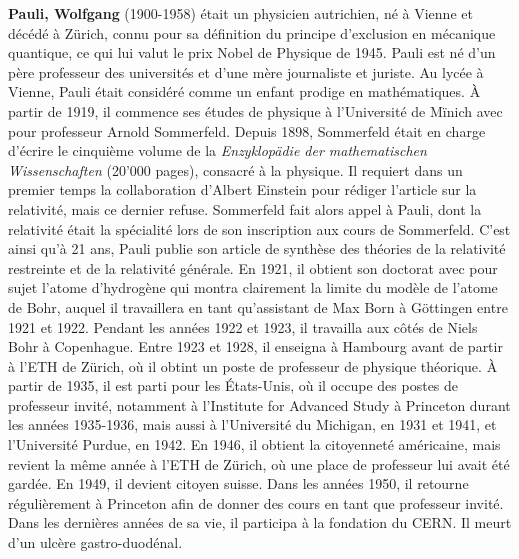 \textbf{Pauli, Wolfgang} (1900-1958) était un physicien autrichien, né à Vienne et décédé à Zürich, connu pour sa définition du principe d'exclusion en mécanique quantique, ce qui lui valut le prix Nobel de Physique de 1945. Pauli est né d'un père professeur des universités et d'une mère journaliste et juriste. Au lycée à Vienne, Pauli était considéré comme un enfant prodige en mathématiques. À partir de 1919, il commence ses études de physique à l'Université de Mïnich avec pour professeur Arnold Sommerfeld. Depuis 1898, Sommerfeld était en charge d'écrire le cinquième volume de la \textit{Enzyklopädie der mathematischen Wissenschaften} (20'000 pages), consacré à la physique. Il requiert dans un premier temps la collaboration d'Albert Einstein pour rédiger l'article sur la relativité, mais ce dernier refuse. Sommerfeld fait alors appel à Pauli, dont la relativité était la spécialité lors de son inscription aux cours de Sommerfeld. C'est ainsi qu'à 21 ans, Pauli publie son article de synthèse des théories de la relativité restreinte et de la relativité générale. En 1921, il obtient son doctorat avec pour sujet l'atome d'hydrogène qui montra clairement la limite du modèle de l'atome de Bohr, auquel il travaillera en tant qu'assistant de Max Born à Göttingen entre 1921 et 1922. Pendant les années 1922 et 1923, il travailla aux côtés de Niels Bohr à Copenhague. Entre 1923 et 1928, il enseigna à Hambourg avant de partir à l'ETH de Zürich, où il obtint un poste de professeur de physique théorique. À partir de 1935, il est parti pour les États-Unis, où il occupe des postes de professeur invité, notamment à l'Institute for Advanced Study à Princeton durant les années 1935-1936, mais aussi à l'Université du Michigan, en 1931 et 1941, et l'Université Purdue, en 1942. En 1946, il obtient la citoyenneté américaine, mais revient la même année à l'ETH de Zürich, où une place de professeur lui avait été gardée. En 1949, il devient citoyen suisse. Dans les années 1950, il retourne régulièrement à Princeton afin de donner des cours en tant que professeur invité. Dans les dernières années de sa vie, il participa à la fondation du CERN. Il meurt d'un ulcère gastro-duodénal.

